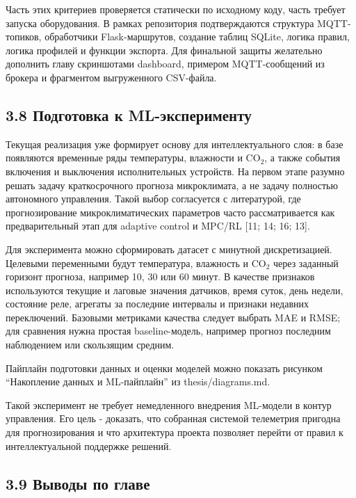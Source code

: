 \documentclass[a4paper,14pt]{extarticle}
\renewcommand{\texttt}[1]{\textnormal{#1}}
\begin{document}
Часть этих критериев проверяется статически по исходному коду, часть
требует запуска оборудования. В рамках репозитория подтверждаются
структура MQTT-топиков, обработчики Flask-маршрутов, создание таблиц
SQLite, логика правил, логика профилей и функции экспорта. Для финальной
защиты желательно дополнить главу скриншотами dashboard, примером
MQTT-сообщений из брокера и фрагментом выгруженного CSV-файла.

\subsection{3.8 Подготовка к
ML-эксперименту}\label{ux43fux43eux434ux433ux43eux442ux43eux432ux43aux430-ux43a-ml-ux44dux43aux441ux43fux435ux440ux438ux43cux435ux43dux442ux443}

Текущая реализация уже формирует основу для интеллектуального слоя: в
базе появляются временные ряды температуры, влажности и CO\(_2\), а
также события включения и выключения исполнительных устройств. На первом
этапе разумно решать задачу краткосрочного прогноза микроклимата, а не
задачу полностью автономного управления. Такой выбор согласуется с
литературой, где прогнозирование микроклиматических параметров часто
рассматривается как предварительный этап для adaptive control и MPC/RL
{[}11; 14; 16; 13{]}.

Для эксперимента можно сформировать датасет с минутной дискретизацией.
Целевыми переменными будут температура, влажность и CO\(_2\) через
заданный горизонт прогноза, например 10, 30 или 60 минут. В качестве
признаков используются текущие и лаговые значения датчиков, время суток,
день недели, состояние реле, агрегаты за последние интервалы и признаки
недавних переключений. Базовыми метриками качества следует выбрать MAE и
RMSE; для сравнения нужна простая baseline-модель, например прогноз
последним наблюдением или скользящим средним.

Пайплайн подготовки данных и оценки моделей можно показать рисунком
``Накопление данных и ML-пайплайн'' из \texttt{thesis/diagrams.md}.

Такой эксперимент не требует немедленного внедрения ML-модели в контур
управления. Его цель - доказать, что собранная системой телеметрия
пригодна для прогнозирования и что архитектура проекта позволяет перейти
от правил к интеллектуальной поддержке решений.

\subsection{3.9 Выводы по
главе}\label{ux432ux44bux432ux43eux434ux44b-ux43fux43e-ux433ux43bux430ux432ux435-1}
\end{document}
